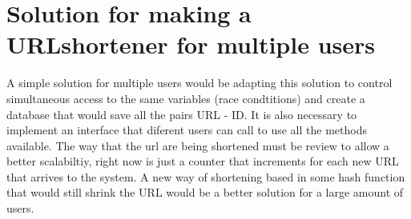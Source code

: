 \documentclass[a4paper]{article}
\begin{document}
\section*{Solution for making a URLshortener for multiple users}
A simple solution for multiple users would be adapting this solution to control simultaneous access to the same variables (race condtitions) and create a database that would save all the pairs URL - ID. It is also necessary to implement an interface that diferent users can call to use all the methods available. The way that the url are being shortened must be review to allow a better scalabiltiy, right now is just a counter that increments for each new URL that arrives to the system. A new way of shortening based in some hash function that would still shrink the URL would be a better solution for a large amount of users. 

 
\end{document}
